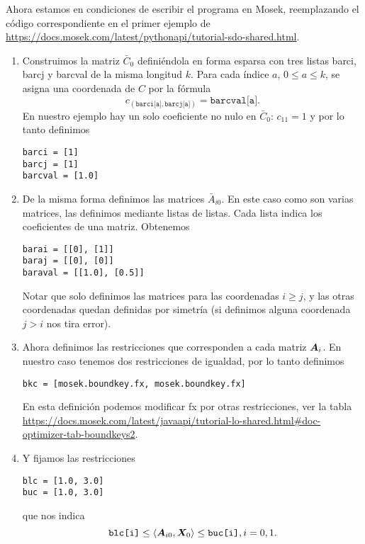 \documentclass[11pt]{article}
\begin{document}
Ahora estamos en condiciones de escribir el programa en Mosek, reemplazando el código correspondiente en el primer ejemplo de \url{https://docs.mosek.com/latest/pythonapi/tutorial-sdo-shared.html}.

\begin{enumerate}
\item Construimos la matriz $\bar C_0$ definiéndola en forma esparsa con tres listas barci, barcj y barcval de la misma longitud $k$. Para cada índice $a$, $0 \le a \le k$, se asigna una coordenada de $C$ por la fórmula 
    $$c_{(\texttt{barci[a]}, \texttt{barcj[a]})} = \texttt{barcval[a]}.$$
    En nuestro ejemplo hay un solo coeficiente no nulo en $\bar C_0$: $c_{11} = 1$ y por lo tanto definimos
\begin{lstlisting}    
barci = [1]
barcj = [1]
barcval = [1.0]
\end{lstlisting}

\item De la misma forma definimos las matrices $\bar A_{i0}$. En este caso como son varias matrices, las definimos mediante listas de listas. Cada lista indica los coeficientes de una matriz. Obtenemos
\begin{lstlisting}
barai = [[0], [1]]
baraj = [[0], [0]]
baraval = [[1.0], [0.5]]
\end{lstlisting}

Notar que solo definimos las matrices para las coordenadas $i \ge j$, y las otras coordenadas quedan definidas por simetr\'ia (si definimos alguna coordenada $j > i$ nos tira error).

\item Ahora definimos las restricciones que corresponden a cada matriz $\bm{A}_i$. En nuestro caso tenemos dos restricciones de igualdad, por lo tanto definimos
\begin{lstlisting}
bkc = [mosek.boundkey.fx, mosek.boundkey.fx]
\end{lstlisting}

En esta definici\'on podemos modificar fx por otras restricciones, ver la tabla
\url{https://docs.mosek.com/latest/javaapi/tutorial-lo-shared.html#doc-optimizer-tab-boundkeys2}.

\item Y fijamos las restricciones
\begin{lstlisting}
blc = [1.0, 3.0]
buc = [1.0, 3.0]
\end{lstlisting}
que nos indica
$$\texttt{blc[i]} \le \langle \bm{A}_{i0}, \bm{X}_{0} \rangle \le \texttt{buc[i]}, i = 0,1.$$


\end{enumerate}
\end{document}
